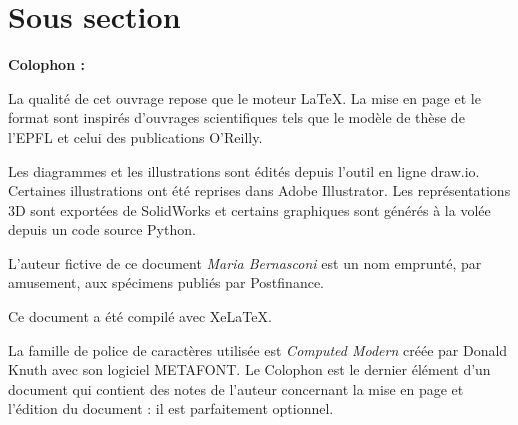 \documentclass[
    iai, %
    eai, %
]{heig-tb}
\begin{document}
\section{Sous section}
\lipsum[1]

\let\cleardoublepage\clearpage
\backmatter

\label{glossaire}
\printnoidxglossary
\printbibliography
\label{index}
\printindex

\clearpage
\Large\textbf{Colophon :}\par\normalsize
\thispagestyle{empty}
La qualité de cet ouvrage repose que le moteur \LaTeX. La mise en page et le format sont inspirés d'ouvrages scientifiques tels que le modèle de thèse de l'EPFL et celui des publications O'Reilly.

Les diagrammes et les illustrations sont édités depuis l'outil en ligne draw.io. Certaines illustrations ont été reprises dans Adobe Illustrator. Les représentations 3D sont exportées de SolidWorks et certains graphiques sont générés à la volée depuis un code source Python.

L'auteur fictive de ce document \emph{Maria Bernasconi} est un nom emprunté, par amusement, aux spécimens publiés par Postfinance.

Ce document a été compilé avec XeLaTeX.

La famille de police de caractères utilisée est \emph{Computed Modern} créée par Donald Knuth avec son logiciel METAFONT.
\vfil
Le Colophon est le dernier élément d'un document qui contient des notes de l'auteur concernant la mise en page et l'édition du document : il est parfaitement optionnel.
\end{document}
